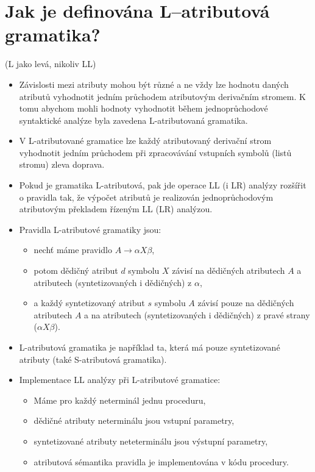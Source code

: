 \documentclass{article}
\begin{document}
\section{Jak je definována L–atributová gramatika?}\textcolor{myGray}{(L jako levá, nikoliv LL)}
\begin{itemize}
    \item Závislosti mezi atributy mohou být různé a ne vždy lze hodnotu daných atributů vyhodnotit jedním průchodem atributovým derivačním stromem. K tomu abychom mohli hodnoty vyhodnotit během jednoprůchodové syntaktické analýze byla zavedena L-atributovaná gramatika.
    
    \item V L-atributované gramatice lze každý atributovaný derivační strom vyhodnotit jedním průchodem při zpracovávání vstupních symbolů (listů stromu) zleva doprava.
    
    \item Pokud je gramatika L-atributová, pak jde operace LL (i LR) analýzy rozšířit o pravidla tak, že výpočet atributů je realizován jednoprůchodovým atributovým překladem řízeným LL (LR) analýzou.
    
    \item Pravidla L-atributové gramatiky jsou:
    \begin{itemize}
        \item nechť máme pravidlo $ A \rightarrow \alpha X \beta $,
        \item potom dědičný atribut $d$ symbolu $X$ závisí na dědičných atributech $A$ a atributech (syntetizovaných i dědičných) z $\alpha$,
        \item a každý syntetizovaný atribut $s$ symbolu $A$ závisí pouze na dědičných atributech $A$ a na atributech (syntetizovaných i dědičných) z pravé strany ($\alpha X \beta$).
    \end{itemize}
    
    \item L-atributová gramatika je například ta, která má pouze syntetizované atributy (také S-atributová gramatika).
    
    \item Implementace LL analýzy při L-atributové gramatice:
    \begin{itemize}
        \item Máme pro každý neterminál jednu proceduru,
        \item dědičné atributy neterminálu jsou vstupní parametry,
        \item syntetizované atributy neteterminálu jsou výstupní parametry,
        \item atributová sémantika pravidla je implementována v kódu procedury. 
    \end{itemize}
\end{itemize}
\newpage
\end{document}
